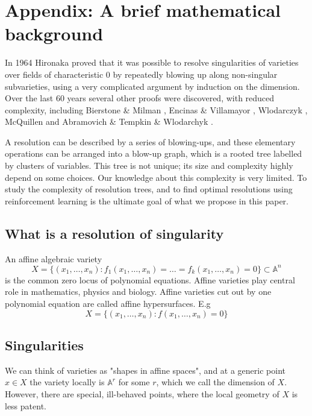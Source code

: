 \documentclass{article}
\theoremstyle{plain}
\theoremstyle{definition}
\theoremstyle{remark}
\begin{document}




\newpage
\appendix
\onecolumn
\section{Appendix: A brief mathematical background}
In 1964 Hironaka proved that it was possible to resolve singularities of varieties over fields of characteristic 0 by repeatedly blowing up along non-singular subvarieties, using a very complicated argument by induction on the dimension. Over the last 60 years several other proofs were discovered, with reduced complexity, including Bierstone \& Milman \cite{bierstone}, Encinas \& Villamayor \cite{ev98}, Wlodarczyk \cite{vlo}, McQuillen \cite{quillen} and Abramovich \& Tempkin \& Wlodarchyk \cite{atv}.

A resolution can be described by a series of blowing-ups, and these elementary operations can be arranged into a blow-up graph, which is a rooted tree labelled by clusters of variables. This tree is not unique; its size and complexity highly depend on some choices. Our knowledge about this complexity is very limited. To study the complexity of resolution trees, and to find optimal resolutions using reinforcement learning is the ultimate goal of what we propose in this paper. 


\subsection{What is a resolution of singularity}

An affine algebraic variety  
$$X =\{(x_1,\ldots, x_n): f_1(x_1,\ldots, x_n)=\ldots =f_k(x_1,\ldots, x_n)=0\} \subset \mathbb{A}^n$$
is the common zero locus of polynomial equations. Affine varieties play central role in mathematics, physics and biology.   
Affine varieties cut out by one polynomial equation are called affine hypersurfaces. E.g
$$X=\{(x_1,\ldots, x_n):f(x_1,\ldots, x_n)=0\}$$


\subsection{Singularities}

We can think of varieties as "shapes in affine spaces", and at a generic point 
$x \in X$ the variety locally is $\mathbb{A}^r$ for some $r$, which we call the dimension of $X$.
However, there are special, ill-behaved points, where the local geometry of $X$ is less patent.
\end{document}
